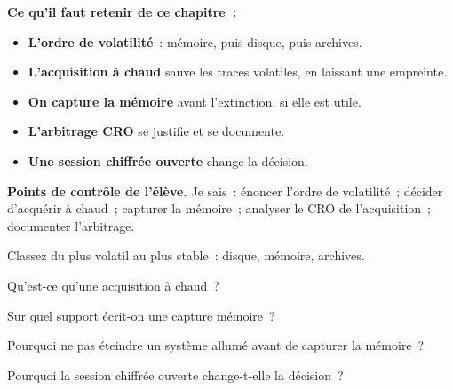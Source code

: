 \begin{boxresume}
\textbf{Ce qu'il faut retenir de ce chapitre~:}
\begin{itemize}
    \item \textbf{L'ordre de volatilité}~: mémoire, puis disque, puis
          archives.
    \item \textbf{L'acquisition à chaud} sauve les traces volatiles, en
          laissant une empreinte.
    \item \textbf{On capture la mémoire} avant l'extinction, si elle est
          utile.
    \item \textbf{L'arbitrage CRO} se justifie et se documente.
    \item \textbf{Une session chiffrée ouverte} change la décision.
\end{itemize}
\end{boxresume}

\begin{boxinfo}
\textbf{Points de contrôle de l'élève.} Je sais~: énoncer l'ordre de
volatilité~; décider d'acquérir à chaud~; capturer la mémoire~; analyser le
CRO de l'acquisition~; documenter l'arbitrage.
\end{boxinfo}

\bigskip

\begin{boxexo}[title={\ding{45}\quad Exercice~9.1. Volatilité \niveaubase}]
Classez du plus volatil au plus stable~: disque, mémoire, archives.
\end{boxexo}

\begin{boxexo}[title={\ding{45}\quad Exercice~9.2. À chaud \niveaubase}]
Qu'est-ce qu'une acquisition à chaud~?
\end{boxexo}

\begin{boxexo}[title={\ding{45}\quad Exercice~9.3. Support \niveaubase}]
Sur quel support écrit-on une capture mémoire~?
\end{boxexo}

\begin{boxexo}[title={\ding{45}\quad Exercice~9.4. Éteindre \niveaumoyen}]
Pourquoi ne pas éteindre un système allumé avant de capturer la mémoire~?
\end{boxexo}

\begin{boxexo}[title={\ding{45}\quad Exercice~9.5. Conteneur chiffré \niveaumoyen}]
Pourquoi la session chiffrée ouverte change-t-elle la décision~?
\end{boxexo}

